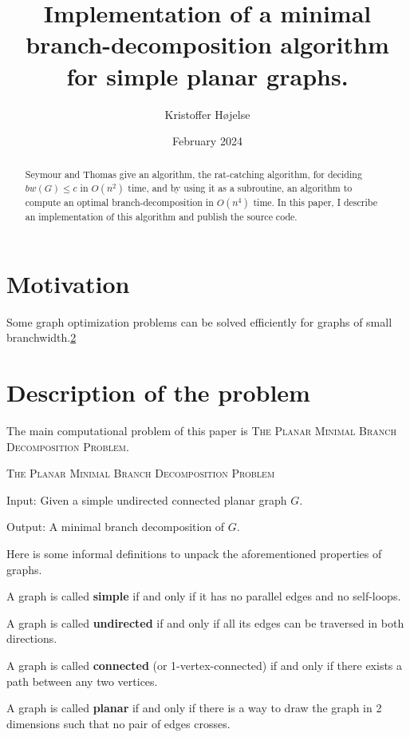 \documentclass{article}
\title{Implementation of a minimal branch-decomposition algorithm for simple planar graphs.}
\author{Kristoffer Højelse}
\date{February 2024}
\begin{document}
\maketitle

\begin{abstract}
	Seymour and Thomas give an algorithm, the rat-catching algorithm, for deciding $bw(G) \leq c$ in $O(n^2)$ time, and by using it as a subroutine, an algorithm to compute an optimal branch-decomposition in $O(n^4)$ time. In this paper, I describe an implementation of this algorithm and publish the source code.
\end{abstract}

\section{Motivation}
	Some graph optimization problems can be solved efficiently for graphs of small branchwidth.\ref{}


\section{Description of the problem}

	The main computational problem of this paper is \textsc{The Planar Minimal Branch Decomposition Problem}.

	\begin{definition}
		\textsc{The Planar Minimal Branch Decomposition Problem}

		Input: Given a simple undirected connected planar graph $G$.

		Output: A minimal branch decomposition of $G$.
	\end{definition}

	Here is some informal definitions to unpack the aforementioned properties of graphs.

	A graph is called \textbf{simple} if and only if it has no parallel edges and no self-loops.

	A graph is called \textbf{undirected} if and only if all its edges can be traversed in both directions.

	A graph is called \textbf{connected} (or 1-vertex-connected) if and only if there exists a path between any two vertices.

	A graph is called \textbf{planar} if and only if there is a way to draw the graph in 2 dimensions such that no pair of edges crosses.
\end{document}
